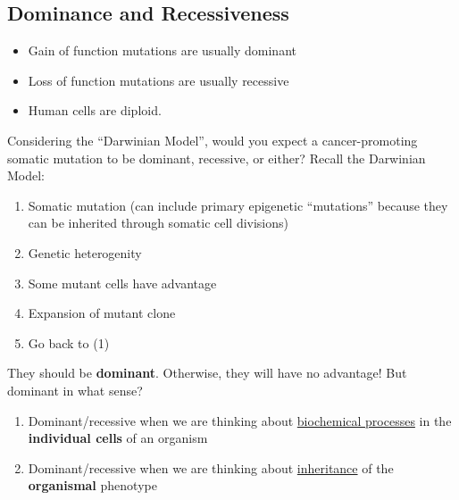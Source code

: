 \documentclass[10pt]{article}
\begin{document}
\subsection*{Dominance and Recessiveness}
\begin{itemize}
	\item Gain of function mutations are usually dominant
	\item Loss of function mutations are usually recessive
	\item Human cells are diploid.
\end{itemize}
Considering the ``Darwinian Model'', would you expect a cancer-promoting somatic mutation to be dominant, recessive, or either?  Recall the Darwinian Model:
\begin{enumerate}
	\item Somatic mutation (can include primary epigenetic ``mutations'' because they can be inherited through somatic cell divisions)
	\item Genetic heterogenity
	\item Some mutant cells have advantage
	\item Expansion of mutant clone
	\item Go back to (1)
\end{enumerate}
They should be \textbf{dominant}.  Otherwise, they will have no advantage!  But dominant in what sense?
\begin{enumerate}
	\item Dominant/recessive when we are thinking about \underline{biochemical processes} in the \textbf{individual cells} of an organism
	\item Dominant/recessive when we are thinking about \underline{inheritance} of the \textbf{organismal} phenotype
\end{enumerate}
\end{document}
